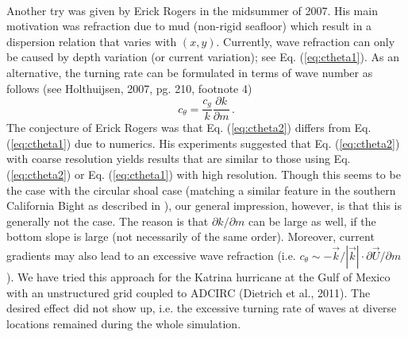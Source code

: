 \documentclass[12pt]{book}
\begin{document}
\\[2ex]
Another try was given by Erick Rogers in the midsummer of 2007. His main motivation was refraction due to mud (non-rigid seafloor) which result in a dispersion relation that varies with $(x,y)$.
Currently, wave refraction can only be caused by depth variation (or current variation); see Eq. (\ref{eq:ctheta1}). As an alternative, the turning rate can be formulated in terms of wave
number as follows (see Holthuijsen, 2007, pg. 210, footnote 4)
\begin{equation}
    c_\theta = \frac{c_g}{k} \frac{\partial k}{\partial m}\, .
  \label{eq:ctheta2}
\end{equation}
The conjecture of Erick Rogers was that Eq. (\ref{eq:ctheta2}) differs from Eq. (\ref{eq:ctheta1}) due to numerics. His experiments suggested that Eq. (\ref{eq:ctheta2})
with coarse resolution yields results that are similar to those using Eq. (\ref{eq:ctheta2}) or Eq. (\ref{eq:ctheta1}) with high resolution. Though this seems to be the case with the
circular shoal case (matching a similar feature in the southern California Bight as described in \cite{Rog07KHJDH}), our general impression, however, is that this is generally not the case. The reason is that $\partial k/\partial m$ can be large as well,
if the bottom slope is large (not necessarily of the same order). Moreover, current gradients may also lead to an excessive wave refraction (i.e.
$c_\theta \sim -\vec{k}/|\vec{k}| \cdot \partial \vec{U}/\partial m$).
We have tried this approach for the Katrina hurricane at the Gulf of Mexico with an unstructured grid coupled to ADCIRC (Dietrich et al., 2011). The desired effect did not
show up, i.e. the excessive turning rate of waves at diverse locations remained during the whole simulation.

 \label{ch:bc}
\end{document}
